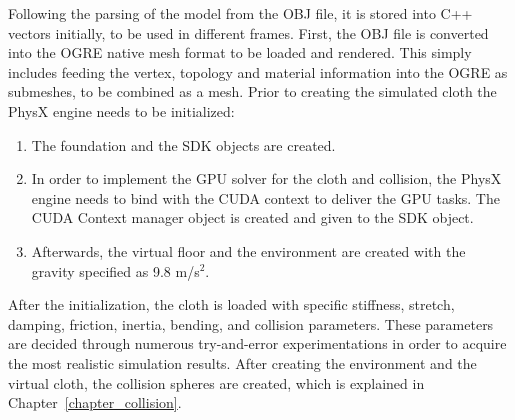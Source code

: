 Following the parsing of the model from the OBJ file, it is stored into C++ vectors initially, to be used in different frames. First, the OBJ file is converted into the OGRE native mesh format to be loaded and rendered. This simply includes feeding the vertex, topology and material information into the OGRE as submeshes, to be combined as a mesh. Prior to creating the simulated cloth the PhysX engine needs to be initialized:

\begin{enumerate}
\item The foundation and the SDK objects are created.
\item In order to implement the GPU solver for the cloth and collision, the PhysX engine needs to bind with the CUDA context to deliver the GPU tasks. The CUDA Context manager object is created and given to the SDK object.
\item Afterwards, the virtual floor and the environment are created with the gravity specified as 9.8 m/s$^2$. 
\end{enumerate}

After the initialization, the cloth is loaded with specific stiffness, stretch, damping, friction, inertia, bending, and collision parameters. These parameters are decided through numerous try-and-error experimentations in order to acquire the most realistic simulation results. After creating the environment and the virtual cloth, the collision spheres are created, which is explained in Chapter~\ref{chapter_collision}.

